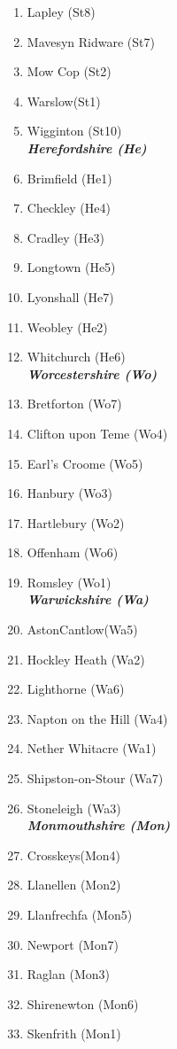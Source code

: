 \begin{refsection}
\begin{multicols}{2}
\begin{enumerate}
		\item Lapley (St8)
		\item Mavesyn Ridware (St7)
		\item Mow Cop (St2)
		\item Warslow(St1)
		\item Wigginton (St10)\\
		\emph{\textbf{Herefordshire (He)}}
		\item Brimfield (He1)
		\item Checkley (He4)
		\item Cradley (He3)
		\item Longtown (He5)
		\item Lyonshall (He7)
		\item Weobley (He2)
		\item Whitchurch (He6)\\
		\emph{\textbf{Worcestershire (Wo)}}
		\item Bretforton (Wo7)
		\item Clifton upon Teme (Wo4)
		\item Earl's Croome (Wo5)
		\item Hanbury (Wo3)
		\item Hartlebury (Wo2)
		\item Offenham (Wo6)
		\item Romsley (Wo1)\\
		\emph{\textbf{Warwickshire (Wa)}}
		\item AstonCantlow(Wa5)
		\item Hockley Heath (Wa2)
		\item Lighthorne (Wa6)
		\item Napton on the Hill (Wa4)
		\item Nether Whitacre (Wa1)
		\item Shipston-on-Stour (Wa7)
		\item Stoneleigh (Wa3)\\
		\emph{\textbf{Monmouthshire (Mon)}}
		\item Crosskeys(Mon4)
		\item Llanellen (Mon2)
		\item Llanfrechfa (Mon5)
		\item Newport (Mon7)
		\item Raglan (Mon3)
		\item Shirenewton (Mon6)
		\item Skenfrith (Mon1)\\

\end{enumerate}
\end{multicols}
\end{refsection}
